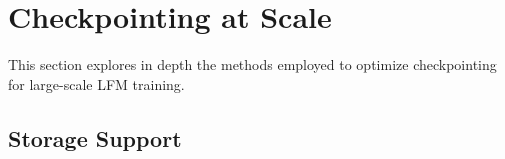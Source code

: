 \section{Checkpointing at Scale}
\label{sec:industrial_scale}
This section explores in depth the methods employed to optimize checkpointing for large-scale LFM training.

\subsection{Storage Support}\label{sec:scale_storage}





